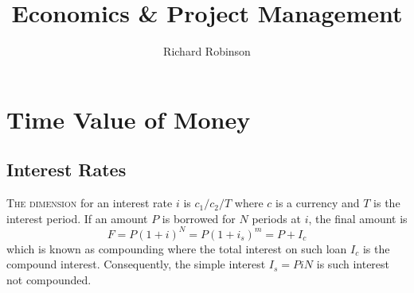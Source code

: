 \documentclass{tufte-book}
\title{Economics \& Project Management}
\author{Richard Robinson}
\begin{document}
\frontmatter
\maketitle

\setlength{\parindent}{0pt}

\mainmatter



\chapter{Time Value of Money}

\section{Interest Rates}

\textsc{The dimension} for an interest rate $i$ is $c_1/c_2/T$ where $c$ is a currency and $T$ is the interest period. If an amount $P$ is borrowed for $N$ periods at $i$, the final amount is \begin{equation}
  F = P(1+i)^N = P(1+i_s)^m = P + I_c
\end{equation}
which is known as compounding where the total interest on such loan $I_c$ is the compound interest. Consequently, the simple interest $I_s = PiN$ is such interest not compounded.
\end{document}
